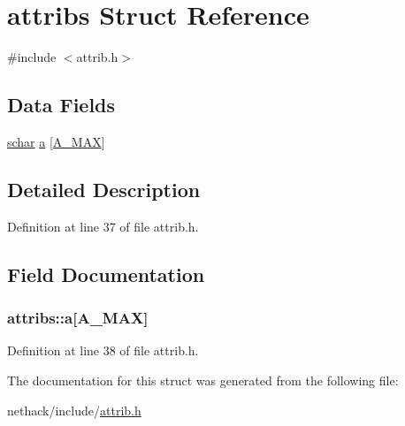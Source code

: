 \hypertarget{structattribs}{\section{attribs Struct Reference}
\label{structattribs}
}


{\ttfamily \#include $<$attrib.\+h$>$}

\subsection*{Data Fields}
\begin{DoxyCompactItemize}
\item 
\hyperlink{config_8h_a0fd9ce9d735064461bebfe6037026093}{schar} \hyperlink{structattribs_acc0fddc9ddcd79c44b492413a49089d2}{a} \mbox{[}\hyperlink{attrib_8h_a8f8289cfc29e0bb2a2626262bfeedf21}{A\+\_\+\+M\+A\+X}\mbox{]}
\end{DoxyCompactItemize}


\subsection{Detailed Description}


Definition at line 37 of file attrib.\+h.



\subsection{Field Documentation}
\hypertarget{structattribs_acc0fddc9ddcd79c44b492413a49089d2}{
\subsubsection[{a}]{ attribs\+::a\mbox{[}{\bf A\+\_\+\+M\+A\+X}\mbox{]}}}\label{structattribs_acc0fddc9ddcd79c44b492413a49089d2}


Definition at line 38 of file attrib.\+h.



The documentation for this struct was generated from the following file\+:\begin{DoxyCompactItemize}
\item 
nethack/include/\hyperlink{attrib_8h}{attrib.\+h}\end{DoxyCompactItemize}

